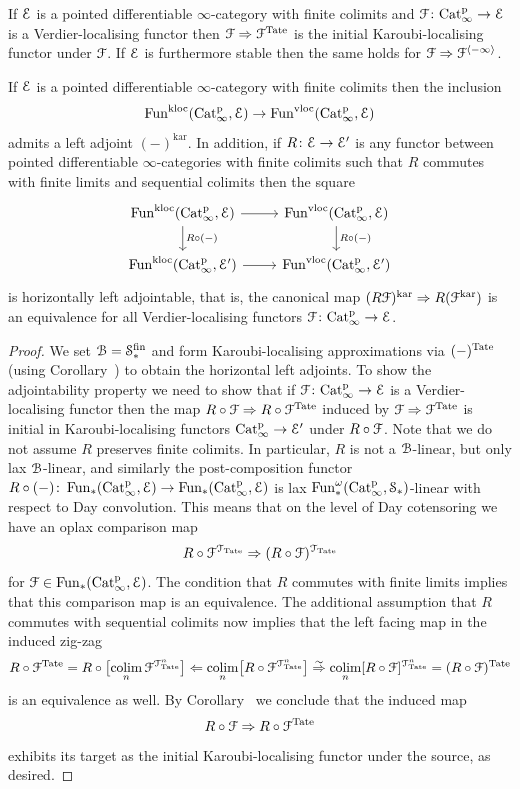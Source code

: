 \begin{corollary}
\label{corollary:tate-dec}%
If $\mathcal{E}$ is a pointed differentiable $\infty$-category with finite colimits and $\mathcal{F}\colon \mathrm{Cat}^{\mathrm p}_\infty \to \mathcal{E}$ is a Verdier-localising functor then $\mathcal{F} \Rightarrow \mathcal{F}^{\operatorname{Tate}}$ is the initial Karoubi-localising functor under $\mathcal{F}$. If $\mathcal{E}$ is furthermore stable then the same holds for $\mathcal{F} \Rightarrow \mathcal{F}^{\langle -\infty \rangle}$.
\end{corollary}

\begin{corollary}
\label{corollary:karoubification}%
If $\mathcal{E}$ is a pointed differentiable $\infty$-category with finite colimits then the inclusion 
\[
\operatorname{Fun}^{\mathrm{kloc}}(\mathrm{Cat}^{\mathrm p}_\infty,\mathcal{E}) \to \operatorname{Fun}^{\mathrm{vloc}}(\mathrm{Cat}^{\mathrm p}_\infty,\mathcal{E})
\]
admits a left adjoint $(-)^{\mathrm{kar}}$. In addition, if $R\colon \mathcal{E} \to \mathcal{E}'$ is any functor between pointed differentiable $\infty$-categories with finite colimits such that $R$ commutes with finite limits and sequential colimits then the square
\[
\begin{tikzcd}
\Funkloc(\Catp,\E)\ar[r]\ar[d,"R\circ (-)"] & \Funvloc(\Catp,\E) \ar[d,"R\circ (-)"] \\
\Funkloc(\Catp,\E')\ar[r] & \Funvloc(\Catp,\E')
\end{tikzcd}
\]
is horizontally left adjointable, that is, the canonical map $(R\mathcal{F})^{\mathrm{kar}} \Rightarrow R(\mathcal{F}^{\mathrm{kar}})$ is an equivalence for all Verdier-localising functors $\mathcal{F} \colon \mathrm{Cat}^{\mathrm p}_\infty \to \mathcal{E}$.
\end{corollary}
\begin{proof}
We set $\mathcal{B} = \mathcal S^{\mathrm{fin}}_*$ and form Karoubi-localising approximations via $(-)^{\operatorname{Tate}}$ (using Corollary~) to obtain the horizontal left adjoints.
To show the adjointability property we need to show that if $\mathcal{F}\colon \mathrm{Cat}^{\mathrm p}_\infty \to \mathcal{E}$ is a Verdier-localising functor then the map $R\circ \mathcal{F} \Rightarrow R\circ \mathcal{F}^{\operatorname{Tate}}$ induced by $\mathcal{F} \Rightarrow \mathcal{F}^{\operatorname{Tate}}$ is initial in Karoubi-localising functors $\mathrm{Cat}^{\mathrm p}_\infty \to \mathcal{E}'$ under $R\circ \mathcal{F}$. Note that we do not assume $R$ preserves finite colimits. In particular, $R$ is not a $\mathcal{B}$-linear, but only lax $\mathcal{B}$-linear, and similarly the post-composition functor $R\circ (-)\colon \operatorname{Fun}_{\ast}(\mathrm{Cat}^{\mathrm p}_\infty,\mathcal{E}) \to \operatorname{Fun}_{\ast}(\mathrm{Cat}^{\mathrm p}_\infty,\mathcal{E})$ is lax $\operatorname{Fun}^{\omega}_{\ast}(\mathrm{Cat}^{\mathrm p}_\infty,\mathcal S_*)$-linear with respect to Day convolution. This means that on the level of Day cotensoring we have an oplax comparison map
\[
R \circ \mathcal{F}^{\mathcal{T}_{\operatorname{Tate}}} \Rightarrow (R\circ \mathcal{F})^{\mathcal{T}_{\operatorname{Tate}}}
\]
for $\mathcal{F} \in \operatorname{Fun}_{\ast}(\mathrm{Cat}^{\mathrm p}_\infty,\mathcal{E})$.
The condition that $R$ commutes with finite limits implies that this comparison map is an equivalence. The additional assumption that $R$ commutes with sequential colimits now implies that the left facing map in the induced zig-zag
\[
R \circ \mathcal{F}^{\operatorname{Tate}} = R \circ \bigl[\mathop{\mathrm{colim}}_n\mathcal{F}^{\mathcal{T}_{\operatorname{Tate}}^{n}}\bigr] \Leftarrow \mathop{\mathrm{colim}}_n \bigl[R \circ \mathcal{F}^{\mathcal{T}_{\operatorname{Tate}}^{n}}\bigr] \stackrel{\sim}{\Rightarrow} \mathop{\mathrm{colim}}_n[R\circ \mathcal{F}]^{\mathcal{T}_{\operatorname{Tate}}^{n}} = (R \circ \mathcal{F})^{\operatorname{Tate}}
\]
is an equivalence as well. By Corollary~ we conclude that the induced map
\[
R \circ \mathcal{F} \Rightarrow R \circ \mathcal{F}^{\operatorname{Tate}}
\]
exhibits its target as the initial Karoubi-localising functor under the source, as desired.
\end{proof}
